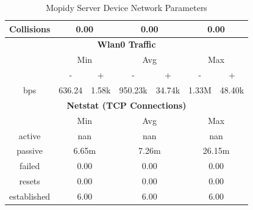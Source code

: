 \documentclass[11pt,a4paper]{scrreprt}
\begin{document}
\begin{table}[H]
\begin{tabular}{||c|c|c|c|c|c|c||}
    \hline
    Collisions & \multicolumn{2}{|c|}{0.00} & \multicolumn{2}{|c|}{0.00} & \multicolumn{2}{|c|}{0.00} \\
    \hline\hline
    \multicolumn{7}{|c|}{\textbf{Wlan0 Traffic}} \\
    \hline\hline
      & \multicolumn{2}{|c|}{Min} & \multicolumn{2}{|c|}{Avg} & \multicolumn{2}{|c|}{Max} \\
    \hline
      & - & + & - & + & - & + \\
    \hline
    bps  & 636.24 & 1.58k & 950.23k & 34.74k & 1.33M & 48.40k \\
    \hline\hline
    \multicolumn{7}{|c|}{\textbf{Netstat (TCP Connections)}} \\
    \hline\hline
      & \multicolumn{2}{|c|}{Min} & \multicolumn{2}{|c|}{Avg} & \multicolumn{2}{|c|}{Max} \\
    \hline
    active & \multicolumn{2}{|c|}{nan} & \multicolumn{2}{|c|}{nan} & \multicolumn{2}{|c|}{nan} \\
    \hline
    passive & \multicolumn{2}{|c|}{6.65m} & \multicolumn{2}{|c|}{7.26m} & \multicolumn{2}{|c|}{26.15m} \\
    \hline
    failed & \multicolumn{2}{|c|}{0.00} & \multicolumn{2}{|c|}{0.00} & \multicolumn{2}{|c|}{0.00} \\
    \hline
    resets & \multicolumn{2}{|c|}{0.00} & \multicolumn{2}{|c|}{0.00} & \multicolumn{2}{|c|}{0.00} \\
    \hline
    established & \multicolumn{2}{|c|}{6.00} & \multicolumn{2}{|c|}{6.00} & \multicolumn{2}{|c|}{6.00} \\
    \hline\hline
    \end{tabular}
    \caption{Mopidy Server Device Network Parameters}
    \label{MopidyserverNetTab}
\end{table}
\end{document}
